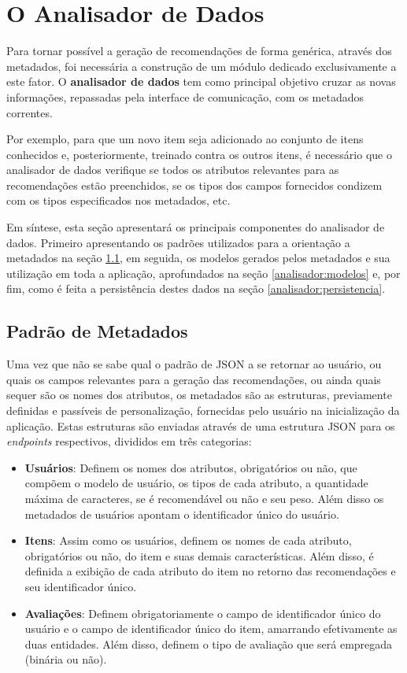 \documentclass[12pt, openright, oneside, a4paper, brazil]{abntex2}
\begin{document}
\section{O Analisador de Dados} \label{analisador}

Para tornar possível a geração de recomendações de forma genérica, através dos metadados, foi necessária a construção de um módulo dedicado exclusivamente a este fator. O \textbf{analisador de dados} tem como principal objetivo cruzar as novas informações, repassadas pela interface de comunicação, com os metadados correntes.

Por exemplo, para que um novo item seja adicionado ao conjunto de itens conhecidos e, posteriormente, treinado contra os outros itens, é necessário que o analisador de dados verifique se todos os atributos relevantes para as recomendações estão preenchidos, se os tipos dos campos fornecidos condizem com os tipos especificados nos metadados, etc.

Em síntese, esta seção apresentará os principais componentes do analisador de dados. Primeiro apresentando os padrões utilizados para a orientação a metadados na seção \ref{analisador:padrao_metadados}, em seguida, os modelos gerados pelos metadados e sua utilização em toda a aplicação, aprofundados na seção \ref{analisador:modelos} e, por fim, como é feita a persistência destes dados na seção \ref{analisador:persistencia}.

\subsection{Padrão de Metadados} \label{analisador:padrao_metadados}

Uma vez que não se sabe qual o padrão de JSON a se retornar ao usuário, ou quais os campos relevantes para a geração das recomendações, ou ainda quais sequer são os nomes dos atributos, os metadados são as estruturas, previamente definidas e passíveis de personalização, fornecidas pelo usuário na inicialização da aplicação. Estas estruturas são enviadas através de uma estrutura JSON para os \textit{endpoints} respectivos, divididos em três categorias:

\begin{itemize}
	\item \textbf{Usuários}: Definem os nomes dos atributos, obrigatórios ou não, que compõem o modelo de usuário, os tipos de cada atributo, a quantidade máxima de caracteres, se é recomendável ou não e seu peso. Além disso os metadados de usuários apontam o identificador único do usuário.

	\item \textbf{Itens}: Assim como os usuários, definem os nomes de cada atributo, obrigatórios ou não, do item e suas demais características. Além disso, é definida a exibição de cada atributo do item no retorno das recomendações e seu identificador único.

	\item \textbf{Avaliações}: Definem obrigatoriamente o campo de identificador único do usuário e o campo de identificador único do item, amarrando efetivamente as duas entidades. Além disso, definem o tipo de avaliação que será empregada (binária ou não).
\end{itemize}
\end{document}

